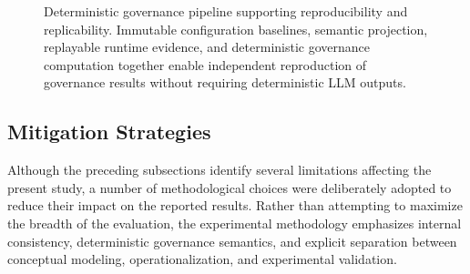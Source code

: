 \documentclass[10pt]{article}
\begin{document}
\begin{figure}[t]
    \centering
    \caption{Deterministic governance pipeline supporting reproducibility and replicability. Immutable configuration baselines, semantic projection, replayable runtime evidence, and deterministic governance computation together enable independent reproduction of governance results without requiring deterministic LLM outputs.}
    \label{fig:reproducibility_pipeline}
\end{figure}

\subsection{Mitigation Strategies}
\label{sec:mitigation_strategies}

Although the preceding subsections identify several limitations affecting the present study, a number of methodological choices were deliberately adopted to reduce their impact on the reported results. Rather than attempting to maximize the breadth of the evaluation, the experimental methodology emphasizes internal consistency, deterministic governance semantics, and explicit separation between conceptual modeling, operationalization, and experimental validation.
\end{document}
